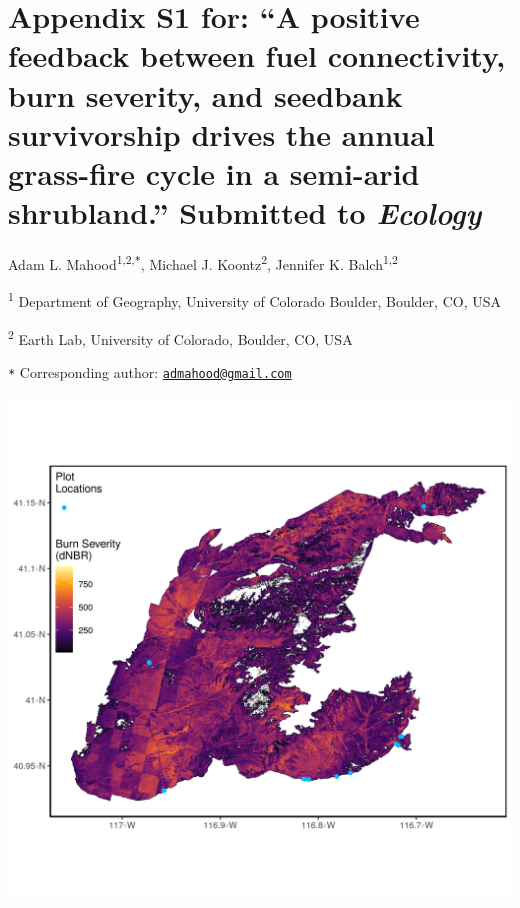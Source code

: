 \documentclass[
  12pt,
]{article}
\author{}
\date{\vspace{-2.5em}}
\begin{document}
\renewcommand{\thetable}{S\arabic{table}}      \setcounter{table}{0} \renewcommand{\thefigure}{S\arabic{figure}}

\hypertarget{appendix-s1-for-a-positive-feedback-between-fuel-connectivity-burn-severity-and-seedbank-survivorship-drives-the-annual-grass-fire-cycle-in-a-semi-arid-shrubland.-submitted-to-ecology}{%
\section{\texorpdfstring{Appendix S1 for: ``A positive feedback between
fuel connectivity, burn severity, and seedbank survivorship drives the
annual grass-fire cycle in a semi-arid shrubland.'' Submitted to
\emph{Ecology}}{Appendix S1 for: ``A positive feedback between fuel connectivity, burn severity, and seedbank survivorship drives the annual grass-fire cycle in a semi-arid shrubland.'' Submitted to Ecology}}\label{appendix-s1-for-a-positive-feedback-between-fuel-connectivity-burn-severity-and-seedbank-survivorship-drives-the-annual-grass-fire-cycle-in-a-semi-arid-shrubland.-submitted-to-ecology}}

Adam L. Mahood\textsuperscript{1,2,\texttt{*}}, Michael J.
Koontz\textsuperscript{2}, Jennifer K. Balch\textsuperscript{1,2}

\small

\textsuperscript{1} Department of Geography, University of Colorado
Boulder, Boulder, CO, USA

\textsuperscript{2} Earth Lab, University of Colorado, Boulder, CO, USA

\texttt{*} Corresponding author:
\href{mailto:admahood@gmail.com}{\nolinkurl{admahood@gmail.com}}

\normalsize

\newpage

\includegraphics{images/map.png} \newpage
\end{document}
